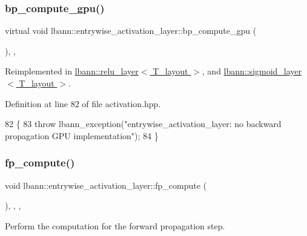 \subsubsection{\texorpdfstring{bp\+\_\+compute\+\_\+gpu()}{bp\_compute\_gpu()}}
{\footnotesize\ttfamily virtual void lbann\+::entrywise\+\_\+activation\+\_\+layer\+::bp\+\_\+compute\+\_\+gpu (\begin{DoxyParamCaption}{ }\end{DoxyParamCaption})\hspace{0.3cm}{\ttfamily [inline]}, {\ttfamily [protected]}, {\ttfamily [virtual]}}



Reimplemented in \hyperlink{classlbann_1_1relu__layer_a236d3e3c92376465d79104703bc8b005}{lbann\+::relu\+\_\+layer$<$ T\+\_\+layout $>$}, and \hyperlink{classlbann_1_1sigmoid__layer_a30a9ff1cd4ec6d4ef4e60859a10b5936}{lbann\+::sigmoid\+\_\+layer$<$ T\+\_\+layout $>$}.



Definition at line 82 of file activation.\+hpp.


\begin{DoxyCode}
82                                 \{
83     \textcolor{keywordflow}{throw} lbann\_exception(\textcolor{stringliteral}{"entrywise\_activation\_layer: no backward propagation GPU implementation"});
84   \}
\end{DoxyCode}
\mbox{\label{classlbann_1_1entrywise__activation__layer_a2ec05802115c5f029fa106c88ada89db}} 
\subsubsection{\texorpdfstring{fp\+\_\+compute()}{fp\_compute()}}
{\footnotesize\ttfamily void lbann\+::entrywise\+\_\+activation\+\_\+layer\+::fp\+\_\+compute (\begin{DoxyParamCaption}{ }\end{DoxyParamCaption})\hspace{0.3cm}{\ttfamily [inline]}, {\ttfamily [override]}, {\ttfamily [protected]}, {\ttfamily [virtual]}}

Perform the computation for the forward propagation step. 

